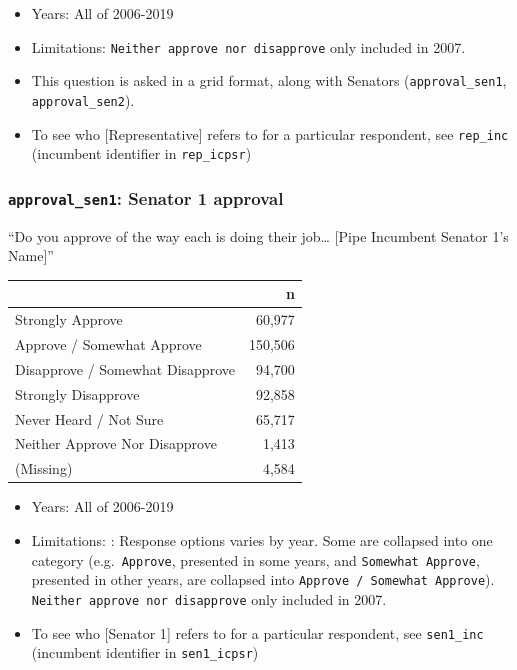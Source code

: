 \documentclass[10pt,article,oneside]{memoir}
\theoremstyle{definition}
\begin{document}
\begin{itemize}
\tightlist
\item
  Years: All of 2006-2019
\item
  Limitations: \texttt{Neither\ approve\ nor\ disapprove} only included
  in 2007.
\item
  This question is asked in a grid format, along with Senators
  (\texttt{approval\_sen1}, \texttt{approval\_sen2}).
\item
  To see who {[}Representative{]} refers to for a particular respondent,
  see \texttt{rep\_inc} (incumbent identifier in \texttt{rep\_icpsr})
\end{itemize}

\hypertarget{approval_sen1-senator-1-approval}{%
\subsubsection{\texorpdfstring{\texttt{approval\_sen1}: Senator 1
approval}{approval\_sen1: Senator 1 approval}}\label{approval_sen1-senator-1-approval}}

``Do you approve of the way each is doing their job\ldots{} {[}Pipe
Incumbent Senator 1's Name{]}''

\begin{table}[H]
\centering
\begin{tabular}{lr}
\toprule
 & n\\
\midrule
Strongly Approve & 60,977\\
Approve / Somewhat Approve & 150,506\\
Disapprove / Somewhat Disapprove & 94,700\\
Strongly Disapprove & 92,858\\
Never Heard / Not Sure & 65,717\\
Neither Approve Nor Disapprove & 1,413\\
(Missing) & 4,584\\
\bottomrule
\end{tabular}
\end{table}

\begin{itemize}
\tightlist
\item
  Years: All of 2006-2019
\item
  Limitations: : Response options varies by year. Some are collapsed
  into one category (e.g.~\texttt{Approve}, presented in some years, and
  \texttt{Somewhat\ Approve}, presented in other years, are collapsed
  into \texttt{Approve\ /\ Somewhat\ Approve}).
  \texttt{Neither\ approve\ nor\ disapprove} only included in 2007.
\item
  To see who {[}Senator 1{]} refers to for a particular respondent, see
  \texttt{sen1\_inc} (incumbent identifier in \texttt{sen1\_icpsr})
\end{itemize}
\end{document}
